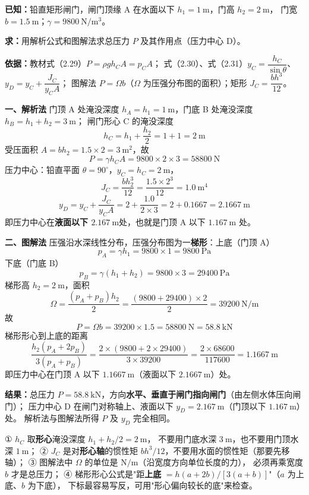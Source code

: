 \begin{jie}
\textbf{已知：}铅直矩形闸门，闸门顶缘 A 在水面以下 $h_1=1\ \mathrm{m}$，门高 $h_2=2\ \mathrm{m}$，
门宽 $b=1.5\ \mathrm{m}$；$\gamma=9800\ \mathrm{N/m^3}$。

\textbf{求：}用解析公式和图解法求总压力 $P$ 及其作用点（压力中心 D）。

\textbf{依据：}教材式（2.29）$P=\rho gh_CA=p_CA$；
式（2.30）、式（2.31）$y_C=\dfrac{h_C}{\sin\theta}$、$y_D=y_C+\dfrac{J_C}{y_CA}$；
图解法 $P=\Omega b$（$\Omega$ 为压强分布图的面积）；矩形 $J_C=\dfrac{bh^3}{12}$。

\textbf{一、解析法}
门顶 A 处淹没深度 $h_A=h_1=1\ \mathrm{m}$，门底 B 处淹没深度 $h_B=h_1+h_2=3\ \mathrm{m}$；
闸门形心 C 的淹没深度
\[ h_C=h_1+\frac{h_2}{2}=1+1=2\ \mathrm{m} \]
受压面积 $A=bh_2=1.5\times2=3\ \mathrm{m^2}$，故
\[ P=\gamma h_CA=9800\times2\times3=58800\ \mathrm{N} \]
压力中心：铅直平面 $\theta=90^{\circ}$，$y_C=h_C=2\ \mathrm{m}$，
\[ J_C=\frac{bh_2^3}{12}=\frac{1.5\times2^3}{12}=1.0\ \mathrm{m^4} \]
\[ y_D=y_C+\frac{J_C}{y_CA}=2+\frac{1.0}{2\times3}=2+0.1667=2.1667\ \mathrm{m} \]
即压力中心在\textbf{液面以下 $2.167\ \mathrm{m}$}处，也就是门顶 A 以下 $1.167\ \mathrm{m}$ 处。

\textbf{二、图解法}
压强沿水深线性分布，压强分布图为一\textbf{梯形}：上底（门顶 A）
\[ p_A=\gamma h_1=9800\times1=9800\ \mathrm{Pa} \]
下底（门底 B）
\[ p_B=\gamma\left(h_1+h_2\right)=9800\times3=29400\ \mathrm{Pa} \]
梯形高 $h_2=2\ \mathrm{m}$，面积
\[ \Omega=\frac{\left(p_A+p_B\right)h_2}{2}=\frac{\left(9800+29400\right)\times2}{2}=39200\ \mathrm{N/m} \]
故
\[ P=\Omega b=39200\times1.5=58800\ \mathrm{N}=58.8\ \mathrm{kN} \]
梯形形心到上底的距离
\[ \frac{h_2\left(p_A+2p_B\right)}{3\left(p_A+p_B\right)}=\frac{2\times\left(9800+2\times29400\right)}{3\times39200}=\frac{2\times68600}{117600}=1.1667\ \mathrm{m} \]
即压力中心在门顶 A 以下 $1.1667\ \mathrm{m}$（液面以下 $2.1667\ \mathrm{m}$）处。

\textbf{结果：}总压力 $P=58.8\ \mathrm{kN}$，方向\textbf{水平、垂直于闸门指向闸门}（由左侧水体压向闸门）；
压力中心 D 在闸门对称轴上、液面以下 $y_D=2.167\ \mathrm{m}$（门顶以下 $1.167\ \mathrm{m}$）处。
解析法与图解法所得 $P$ 及 $y_D$ 完全相同。
\end{jie}

\begin{yicuo}
① $h_C$ 取\textbf{形心}淹没深度 $h_1+h_2/2=2\ \mathrm{m}$，
不要用门底水深 $3\ \mathrm{m}$，也不要用门顶水深 $1\ \mathrm{m}$；
② $J_C$ 是对\textbf{形心轴}的惯性矩 $bh^3/12$，不要用水面的惯性矩（那要先移轴）；
③ 图解法中 $\Omega$ 的单位是 $\mathrm{N/m}$（沿宽度方向单位长度的力），
必须再乘宽度 $b$ 才是总压力；
④ 梯形形心公式是"距\textbf{上底} $=h(a+2b)/[3(a+b)]$"（$a$ 为上底、$b$ 为下底），
下标最容易写反，可用"形心偏向较长的底"来检查。
\end{yicuo}

